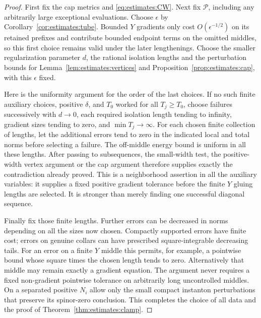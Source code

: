 \begin{proof}
First fix the cap metrics and \eqref{eq:estimates:CW}.  Next fix
$\mathcal P$, including any arbitrarily large exceptional
evaluations.  Choose $\epsilon$ by
Corollary~\ref{cor:estimates:tube}.  Bounded $Y$ gradients only cost
$O(\epsilon^{-1/2})$ on its retained prefixes and contribute bounded
endpoint terms on the omitted middles, so this first choice remains
valid under the later lengthenings.  Choose the smaller
regularization parameter $d$, the rational isolation lengths and
the perturbation bounds for Lemma~\ref{lem:estimates:vertices} and
Proposition~\ref{prop:estimates:cap}, with this $\epsilon$ fixed.

Here is the uniformity argument for the order of the last choices.
If no such finite auxiliary choices, positive $\delta$, and $T_0$
worked for all $T_j\geq T_0$, choose failures successively with
$d\to0$, each required isolation length tending to infinity,
gradient sizes tending to zero, and $\min T_j\to\infty$.
For each chosen finite collection of lengths, let the additional
errors tend to zero in the indicated local and total norms before
selecting a failure.  The off-middle energy bound is uniform in
all these lengths.  After passing to subsequences, the small-width
test, the positive-width vertex argument or the cap argument
therefore supplies exactly the contradiction already proved.
This is a neighborhood assertion in all the auxiliary variables:
it supplies a fixed positive gradient tolerance before the finite
$Y$ gluing lengths are selected.  It is stronger than merely
finding one successful diagonal sequence.

Finally fix those finite lengths.  Further errors can be decreased
in norms depending on all the sizes now chosen.  Compactly
supported errors have finite cost; errors on genuine collars can
have prescribed square-integrable decreasing tails.  For an error
on a finite $Y$ middle this permits, for example, a pointwise bound
whose square times the chosen length tends to zero.  Alternatively
that middle may remain exactly a gradient equation.  The argument
never requires a fixed non-gradient pointwise tolerance on
arbitrarily long uncontrolled middles.  On a separated positive
$N_i$ allow only the small compact instanton perturbations that
preserve its spinor-zero conclusion.  This completes the choice
of all data and the proof of Theorem~\ref{thm:estimates:clamp}.
\end{proof}

